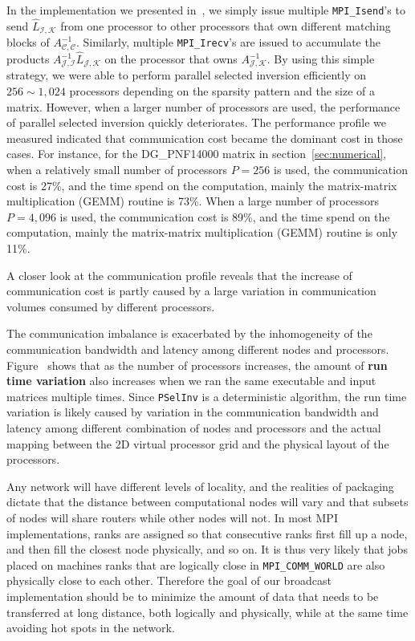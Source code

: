\documentclass{acm_proc_article-sp}
\newcommand{\CS}{\ensuremath{\mathcal C}\xspace}
\newcommand{\JS}{\ensuremath{\mathcal J}\xspace}
\newcommand{\IS}{\ensuremath{\mathcal I}\xspace}
\newcommand{\KS}{\ensuremath{\mathcal K}\xspace}
\newcommand{\pselinv}{\texttt{PSelInv}\xspace}
\begin{document}
In the implementation we presented in~\cite{JacquelinLinYang2014},
we simply issue multiple \texttt{MPI\_Isend}'s to send 
$\hat{L}_{\IS,\KS}$ from one processor to other processors 
that own different matching blocks of $A_{\CS,\CS}^{-1}$. 
Similarly, multiple \texttt{MPI\_Irecv}'s are issued to accumulate 
the products $A^{-1}_{\JS,\IS}\hat{L}_{\JS,\KS}$ on the
processor that owns $A_{\JS,\KS}^{-1}$.
By using this simple strategy, we were able to perform 
parallel selected inversion efficiently on $256\sim 1,024$ processors 
depending on the sparsity pattern and the size of a matrix. 
However, when a larger number of processors are used, the performance
of parallel selected inversion quickly deteriorates.  The
performance profile we measured indicated that
communication cost became the dominant cost in those cases.
For instance, for the DG\_PNF14000 matrix in section~\ref{sec:numerical}, 
when a relatively small number of processors $P=256$ is used, the communication
cost is 27\%, and the time spend on the computation, mainly the
matrix-matrix multiplication (GEMM) routine is 73\%. When a large
number of processors $P=4,096$ is used, the communication
cost is 89\%, and the time spend on the computation, mainly the
matrix-matrix multiplication (GEMM) routine is only 11\%.

A closer look at the communication profile reveals that
the increase of communication cost is partly caused by 
a large variation in communication volumes consumed by different
processors.



The communication imbalance is exacerbated by the inhomogeneity of
the communication bandwidth and latency among different 
nodes and processors.  Figure~ shows that as the number of
processors increases, the amount of \textbf{run time variation} also 
increases when we ran the same executable and input matrices multiple
times.  Since \pselinv is a deterministic algorithm, the run time
variation is likely caused by variation in the communication bandwidth
and latency among different combination of nodes and processors and the actual 
mapping between the 2D virtual processor grid and the physical
layout of the processors.

Any network will have different levels of locality, and the realities 
of packaging dictate that the distance between computational nodes will vary and that
subsets of nodes will share routers while other nodes will not.
In most MPI implementations, ranks are assigned so that consecutive ranks
first fill up a node, and then fill the closest node physically, and so on.
It is thus very likely that jobs placed on machines ranks that
are logically close in \texttt{MPI\_COMM\_WORLD} are also physically
close to each other.
Therefore the goal of our broadcast implementation should be to minimize
the amount of data that needs to be transferred at long distance, both 
logically and physically, while at the same time avoiding hot spots in
the network. 
\end{document}
